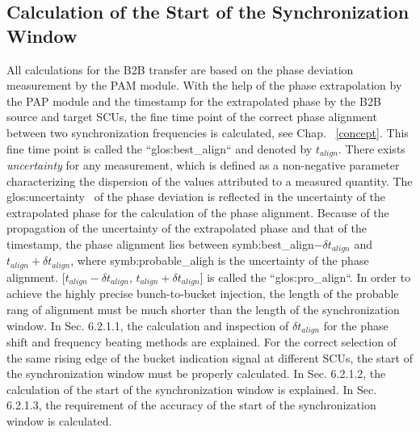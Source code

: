 \subsection{Calculation of the Start of the Synchronization Window}
All calculations for the B2B transfer are based on the phase deviation measurement by the PAM module. With the help of the phase extrapolation by the PAP module and the timestamp for the extrapolated phase by the B2B source and target SCUs, the fine time point of the correct phase alignment between two synchronization frequencies is calculated, see Chap. ~\ref{concept}. This fine time point is called the ``\gls{glos:best_align}`` and denoted by $t_\mathit{align}$. There exists \textit{uncertainty} for any measurement, which is defined as a non-negative parameter characterizing the dispersion of the values attributed to a measured quantity. The \gls{glos:uncertainty}~\cite{taylor_introduction_1982} of the phase deviation is reflected in the uncertainty of the extrapolated phase for the calculation of the phase alignment.
Because of the propagation of the uncertainty of the extrapolated phase and that of the timestamp, the phase alignment lies between \gls{symb:best_align}$-\delta t_\mathit{align}$ and $t_\mathit{align}+\delta t_\mathit{align}$, where \gls{symb:probable_aligh} is the uncertainty of the phase alignment. [$t_\mathit{align}-\delta t_\mathit{align}$, $t_\mathit{align}+\delta t_\mathit{align}$] is called the ``\gls{glos:pro_align}``. In order to achieve the highly precise bunch-to-bucket injection, the length of the probable rang of alignment must be much shorter than the length of the synchronization window. In Sec. 6.2.1.1, the calculation and inspection of $\delta t_\mathit{align}$ for the phase shift and frequency beating methods are explained. For the correct selection of the same rising edge of the bucket indication signal at different SCUs, the start of the synchronization window must be properly calculated. In Sec. 6.2.1.2, the calculation of the start of the synchronization window is explained. In Sec. 6.2.1.3, the requirement of the accuracy of the start of the synchronization window is calculated. 

